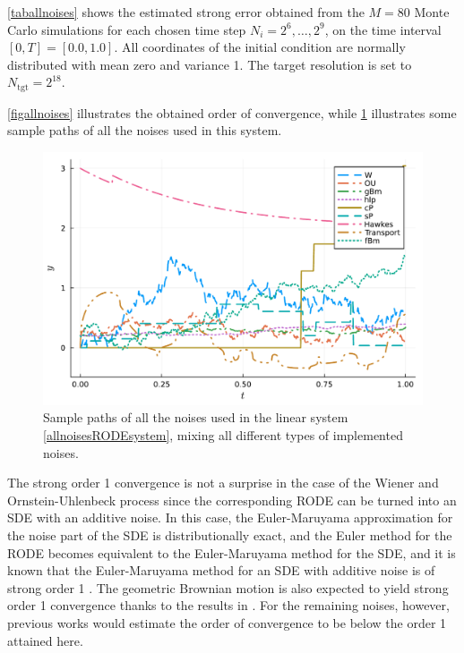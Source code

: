 \documentclass[reqno,12pt]{amsart}
\theoremstyle{plain} %
\theoremstyle{definition} %
\begin{document}
\cref{taballnoises} shows the estimated strong error obtained from the $M = 80$ Monte Carlo simulations for each chosen time step $N_i = 2^6, \ldots, 2^9$,  on the time interval $[0, T] = [0.0, 1.0]$. All coordinates of the initial condition are normally distributed with mean zero and variance 1. The target resolution is set to $N_{\textrm{tgt}} = 2^{18}$.

\cref{figallnoises} illustrates the obtained order of convergence, while \cref{figsamplepathsallnoises} illustrates some sample paths of all the noises used in this system.

\begin{figure}[htb]
    \includegraphics[scale=0.6]{img/noisepath_allnoises.pdf}
    \caption{Sample paths of all the noises used in the linear system \eqref{allnoisesRODEsystem}, mixing all different types of implemented noises.}
    \label{figsamplepathsallnoises}
\end{figure}

The strong order 1 convergence is not a surprise in the case of the Wiener and Ornstein-Uhlenbeck process since the corresponding RODE can be turned into an SDE with an additive noise. In this case, the Euler-Maruyama approximation for the noise part of the SDE is distributionally exact, and the Euler method for the RODE becomes equivalent to the Euler-Maruyama method for the SDE, and it is known that the Euler-Maruyama method for an SDE with additive noise is of strong order 1 \cite{HighamKloeden2021}. The geometric Brownian motion is also expected to yield strong order 1 convergence thanks to the results in \cite{WangCaoHanKloeden2021}. For the remaining noises, however, previous works would estimate the order of convergence to be below the order 1 attained here.
\end{document}
